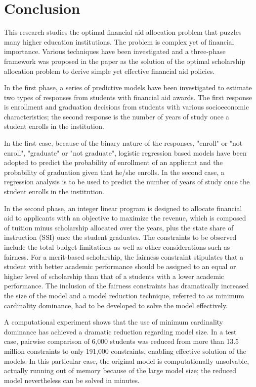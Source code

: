 \documentclass[12pt,english]{report}
\begin{document}

\chapter{Conclusion}
This research studies the optimal financial aid allocation problem that puzzles many higher education institutions.  The problem is complex yet of financial importance. Various techniques have been investigated and a three-phase framework was proposed in the paper as the solution of the optimal scholarship allocation problem to derive simple yet effective financial aid policies.

In the first phase, a series of predictive models have been investigated to estimate two types of responses from students with financial aid awards. The first response is enrollment and graduation decisions from students with various socioeconomic characteristics;  the second response is the number of years of study once a student enrolls in the institution.

In the first case,  because of the binary nature of the responses,  "enroll" or "not enroll",  "graduate" or "not graduate", logistic regression based models have been adopted to predict the probability of enrollment of an applicant and the probability of graduation given that he/she enrolls. In the second case, a regression analysis is to be used to predict the number of years of study once the student enrolls in the institution.

In the second phase, an integer linear program is designed to allocate financial aid to applicants with an objective to maximize the revenue, which is composed of tuition minus scholarship allocated over the years, plus the state share of instruction (SSI) once the student graduates.  The constraints to be observed include the total budget limitations as well as other considerations such as fairness. For a merit-based scholarship, the fairness constraint stipulates that a student with better academic performance should be assigned to an equal or higher level of scholarship than that of a students with a lower academic performance. The inclusion of the fairness constraints has dramatically increased the size of the model and a model reduction technique, referred to as minimum cardinality dominance, had to be developed to solve the model effectively.

A computational experiment shows that the use of minimum cardinality dominance has achieved a dramatic reduction regarding model size. In a test case, pairwise comparison of 6,000 students was reduced from more than 13.5 million constraints to only 191,000 constraints, enabling effective solution of the models.  In this particular case,  the original model is computationally unsolvable, actually running out of memory because of the large model size;  the reduced model nevertheless can be solved in minutes.
\end{document}
